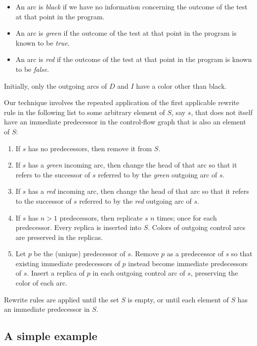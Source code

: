 \begin{itemize}
\item An arc is \emph{black} if we have no information concerning the
  outcome of the test at that point in the program.
\item An arc is \emph{green} if the outcome of the test at that point in
  the program is known to be \emph{true}.
\item An arc is \emph{red} if the outcome of the test at that point in
  the program is known to be \emph{false}.
\end{itemize}

Initially, only the outgoing arcs of $D$ and $I$ have a color
other than black.

Our technique involves the repeated application of the first
applicable rewrite rule in the following list to some arbitrary
element of $S$, say $s$, that does not itself have an immediate
predecessor in the control-flow graph that is also an element of $S$:

\begin{enumerate}
\item If $s$ has no predecessors, then remove it from $S$.
\item If $s$ has a \emph{green} incoming arc, then change the head
  of that arc so that it refers to the successor of $s$ referred to
  by the \emph{green} outgoing arc of $s$.
\item If $s$ has a \emph{red} incoming arc, then change the head
  of that arc so that it refers to the successor of $s$ referred to
  by the \emph{red} outgoing arc of $s$.
\item If $s$ has $n>1$ predecessors, then replicate $s$ $n$ times;
  once for each predecessor.  Every replica is inserted into $S$.
  Colors of outgoing control arcs are preserved in the replicas.
\item Let $p$ be the (unique) predecessor of $s$.  Remove $p$ as a
  predecessor of $s$ so that existing immediate predecessors of $p$
  instead become immediate predecessors of $s$.  Insert a replica of
  $p$ in each outgoing control arc of $s$, preserving the color of
  each arc.
\end{enumerate}

\noindent
Rewrite rules are applied until the set $S$ is empty, or until each
element of $S$ has an immediate predecessor in $S$.

\subsection{A simple example}
\label{sec-our-technique-example}

